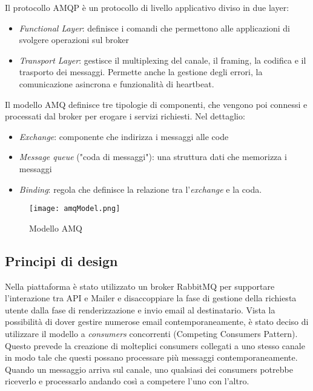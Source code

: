 Il protocollo AMQP è un protocollo di livello applicativo diviso in due layer:
\begin{itemize}
    \itemsep0em
    \item \textit{Functional Layer}: definisce i comandi che permettono alle applicazioni di svolgere operazioni sul broker
    \item \textit{Transport Layer}:  gestisce il multiplexing del canale, il framing, la codifica e il trasporto dei messaggi. Permette anche la gestione degli errori, la comunicazione asincrona e funzionalità di heartbeat.
\end{itemize}

Il modello AMQ definisce tre tipologie di componenti, che vengono poi connessi e processati dal broker per erogare i servizi richiesti.
Nel dettaglio:
\begin{itemize}
    \itemsep0em
    \item \textit{Exchange}: componente che indirizza i messaggi alle code
    \item \textit{Message queue} ("coda di messaggi"): una struttura dati che memorizza i messaggi
    \item \textit{Binding}: regola che definisce la relazione tra l'\textit{exchange} e la coda.
\end{itemize}

\begin{figure}[h]
    \centering
    \texttt{[image: amqModel.png]}
    \caption{Modello AMQ}
    \label{fig:AmqModel}
\end{figure}


\subsection{Principi di design}
Nella piattaforma è stato utilizzato un broker RabbitMQ per supportare l'interazione tra API e Mailer e
disaccoppiare la fase di gestione della richiesta utente dalla fase di renderizzazione e invio email al destinatario.
Vista la possibilità di dover gestire numerose email contemporaneamente, è stato deciso di utilizzare il modello a \textit{consumers} concorrenti (Competing Consumers Pattern)\cite{CompetingConsumers}.
Questo prevede la creazione di molteplici consumers collegati a uno stesso canale in modo tale che questi possano processare più messaggi contemporaneamente.
Quando un messaggio arriva sul canale, uno qualsiasi dei consumers potrebbe riceverlo e processarlo andando così a competere l'uno con l'altro.

